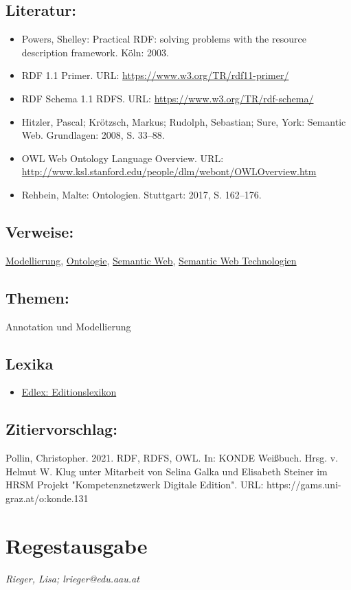 \documentclass{article}
\begin{document}
        \subsection*{Literatur:}\begin{itemize}\item Powers, Shelley: Practical RDF: solving problems with the resource description framework. Köln: 2003.\item RDF 1.1 Primer. URL: \url{https://www.w3.org/TR/rdf11-primer/}\item RDF Schema 1.1 RDFS. URL: \url{https://www.w3.org/TR/rdf-schema/}\item Hitzler, Pascal; Krötzsch, Markus; Rudolph, Sebastian; Sure, York: Semantic Web. Grundlagen: 2008, S. 33–88.\item OWL Web Ontology Language Overview. URL: \url{http://www.ksl.stanford.edu/people/dlm/webont/OWLOverview.htm}\item Rehbein, Malte: Ontologien. Stuttgart: 2017, S. 162–176.\end{itemize}\subsection*{Verweise:}\href{https://gams.uni-graz.at/o:konde.137}{Modellierung}, \href{https://gams.uni-graz.at/o:konde.151}{Ontologie}, \href{https://gams.uni-graz.at/o:konde.167}{Semantic Web}, \href{https://gams.uni-graz.at/o:konde.168}{Semantic Web Technologien}\subsection*{Themen:}Annotation und Modellierung\subsection*{Lexika}\begin{itemize}\item \href{https://edlex.de/index.php?title=Resource_Description_Framework_(RDF)}{Edlex: Editionslexikon}\end{itemize}\subsection*{Zitiervorschlag:}Pollin, Christopher. 2021. RDF, RDFS, OWL. In: KONDE Weißbuch. Hrsg. v. Helmut W. Klug unter Mitarbeit von Selina Galka und Elisabeth Steiner im HRSM Projekt "Kompetenznetzwerk Digitale Edition". URL: https://gams.uni-graz.at/o:konde.131\newpage\section*{Regestausgabe} \emph{Rieger, Lisa; lrieger@edu.aau.at }\\
        
\end{document}
